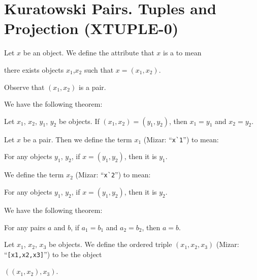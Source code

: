 \section{Kuratowski Pairs. Tuples and Projection (XTUPLE-0)}

\begin{definition}
Let $x$ be an object. We define the attribute that $x$ is a
 to mean
\begin{defn}
\item there exists objects $x_{1}$,$x_{2}$ such that $x=(x_{1},x_{2})$.
\end{defn}
Observe that $(x_{1},x_{2})$ is a pair.
\end{definition}

We have the following theorem:
\begin{thm}
\item\label{xtuple0:1} Let $x_{1}$, $x_{2}$, $y_{1}$, $y_{2}$ be objects. If
  $(x_{1},x_{2})=(y_{1},y_{2})$, then $x_{1}=y_{1}$ and $x_{2}=y_{2}$.
\end{thm}

\begin{definition}
Let $x$ be a pair. Then we define the term $x_{1}$ (Mizar:
``\verb#x`1#'') to mean:
\begin{defn}
\item For any objects $y_{1}$, $y_{2}$, if $x=(y_{1},y_{2})$, then it is $y_{1}$.
\end{defn}
We define the term $x_{2}$ (Mizar: ``\verb#x`2#'') to mean:
\begin{defn}
\item For any objects $y_{1}$, $y_{2}$, if $x=(y_{1},y_{2})$, then it is $y_{2}$.
\end{defn}
\end{definition}


We have the following theorem:
\begin{thm}
\item\label{xtuple0:2} For any pairs $a$ and $b$, if $a_{1}=b_{1}$ and
  $a_{2}=b_{2}$, then $a=b$. 
\end{thm}


\begin{definition}
Let $x_{1}$, $x_{2}$, $x_{3}$ be objects. We define the ordered triple
$(x_{1},x_{2},x_{3})$ (Mizar: ``\verb#[x1,x2,x3]#'') to be the object
\begin{defn}
\item $((x_{1},x_{2}),x_{3})$.
\end{defn}
\end{definition}

